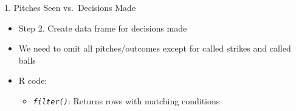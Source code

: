 \documentclass[14pt,ignorenonframetext,aspectratio = 1610]{beamer}
\newenvironment{Shaded}{\begin{snugshade}}{\end{snugshade}}
\newcommand{\KeywordTok}[1]{\textcolor[rgb]{0.13,0.29,0.53}{\textbf{{#1}}}}
\newcommand{\DataTypeTok}[1]{\textcolor[rgb]{0.13,0.29,0.53}{{#1}}}
\newcommand{\StringTok}[1]{\textcolor[rgb]{0.31,0.60,0.02}{{#1}}}
\newcommand{\NormalTok}[1]{{#1}}
\providecommand{\tightlist}{%
\setlength{\itemsep}{0pt}\setlength{\parskip}{0pt}}
\begin{document}
\begin{frame}[fragile]{1. Pitches Seen vs.~Decisions Made}

\begin{itemize}
\tightlist
\item
  Step 2. Create data frame for decisions made
\item
  We need to omit all pitches/outcomes except for called strikes and
  called balls
\item
  R code:

  \begin{itemize}
  \tightlist
  \item
    \emph{\texttt{filter()}}: Returns rows with matching conditions
  \end{itemize}
\end{itemize}

\footnotesize

\begin{Shaded}
\end{Shaded}

\end{frame}
\end{document}

